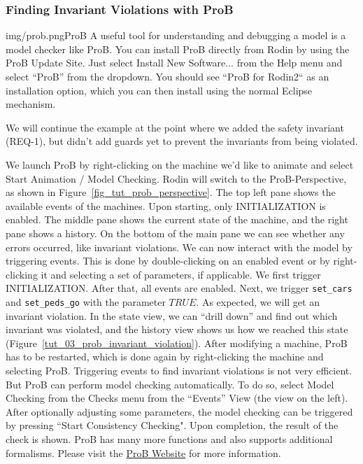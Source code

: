 \subsubsection{Finding Invariant Violations with ProB}
\label{tut:prob}
\begin{rodin-plugin}{img/prob.png}{ProB}
A useful tool for understanding and debugging a model is a model checker like ProB. You can install ProB directly from Rodin by using the ProB Update Site.  Just select \textsf{Install New Software...} from the \textsf{Help} menu and select ``ProB'' from the dropdown. You should see ``ProB for Rodin2`` as an installation option, which you can then install using the normal Eclipse mechanism. 

We will continue the example at the point where we added the safety invariant (REQ-1), but didn't add guards yet to prevent the invariants from being violated.

We launch ProB by right-clicking on the machine we'd like to animate and select \textsf{Start Animation / Model Checking}.  Rodin will switch to the ProB-Perspective, as shown in Figure~\ref{fig_tut_prob_perspective}. The top left pane shows the available events of the machines.  Upon starting, only INITIALIZATION is enabled.  The middle pane shows the current state of the machine, and the right pane shows a history.  On the bottom of the main pane we can see whether any errors occurred, like invariant violations. We can now interact with the model by triggering events.  This is done by double-clicking on an enabled event or by right-clicking it and selecting a set of parameters, if applicable.  We first trigger INITIALIZATION.  After that, all events are enabled.  Next, we trigger \texttt{set\_cars} and \texttt{set\_peds\_go}  with the parameter $TRUE$.  As expected, we will get an invariant violation.  In the state view, we can ``drill down'' and find out which invariant was violated, and the history view shows us how we reached this state (Figure~\ref{tut_03_prob_invariant_violation}). After modifying a machine, ProB has to be restarted, which is done again by right-clicking the machine and selecting ProB.  Triggering events to find invariant violations is not very efficient.  But ProB can perform model checking automatically.  To do so, select \textsf{Model Checking} from the \textsf{Checks} menu from the ``Events'' View (the view on the left).  After optionally adjusting some parameters, the model checking can be triggered by pressing ``Start Consistency Checking".  Upon completion, the result of the check is shown. ProB has many more functions and also supports additional formalisms. Please visit the \href{http://www.stups.uni-duesseldorf.de/ProB}{ProB Website} for more information.

\end{rodin-plugin}

